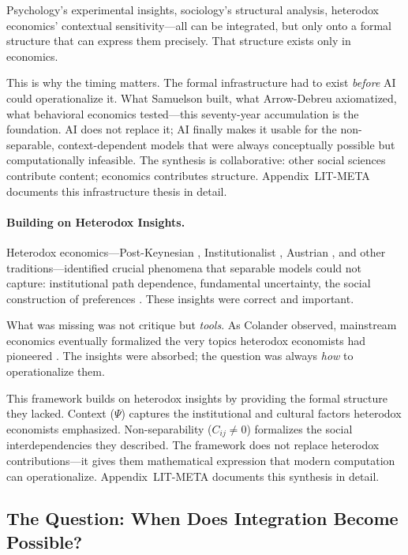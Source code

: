 Psychology's experimental insights, sociology's structural analysis, heterodox economics' contextual sensitivity---all can be integrated, but only onto a formal structure that can express them precisely. That structure exists only in economics.

This is why the timing matters. The formal infrastructure had to exist \emph{before} AI could operationalize it. What Samuelson built, what Arrow-Debreu axiomatized, what behavioral economics tested---this seventy-year accumulation is the foundation. AI does not replace it; AI finally makes it usable for the non-separable, context-dependent models that were always conceptually possible but computationally infeasible. The synthesis is collaborative: other social sciences contribute content; economics contributes structure. Appendix~LIT-META documents this infrastructure thesis in detail.

\paragraph{Building on Heterodox Insights.}
Heterodox economics---Post-Keynesian \citep{lavoie2014}, Institutionalist \citep{hodgson2004}, Austrian \citep{hayek1945knowledge}, and other traditions---identified crucial phenomena that separable models could not capture: institutional path dependence, fundamental uncertainty, the social construction of preferences \citep{lawson2006nature,davis2008heterodox}. These insights were correct and important.

What was missing was not critique but \emph{tools}. As Colander observed, mainstream economics eventually formalized the very topics heterodox economists had pioneered \citep{colander2004changing}. The insights were absorbed; the question was always \emph{how} to operationalize them.

This framework builds on heterodox insights by providing the formal structure they lacked. Context ($\Psi$) captures the institutional and cultural factors heterodox economists emphasized. Non-separability ($C_{ij} \neq 0$) formalizes the social interdependencies they described. The framework does not replace heterodox contributions---it gives them mathematical expression that modern computation can operationalize. Appendix~LIT-META documents this synthesis in detail.

\subsection{The Question: When Does Integration Become Possible?}
\label{sec:intro-question}

